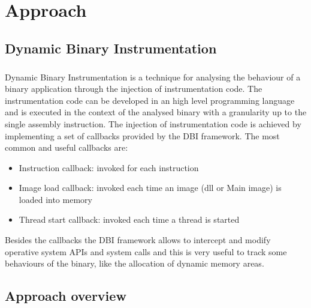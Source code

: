\chapter{Approach}
\label{chapter3}
\thispagestyle{empty}

\section{Dynamic Binary Instrumentation}
\paragraph{}
Dynamic Binary Instrumentation is a technique for analysing the behaviour of a binary application through the injection of instrumentation code. The instrumentation code can be developed in an high level programming language and is executed in the context of the analysed binary with a granularity up to the single assembly instruction. The injection of instrumentation code is achieved by implementing a set of callbacks provided by the DBI framework. The most common and useful callbacks are:
\begin{itemize}
 \item Instruction callback: invoked for each instruction
 \item Image load callback: invoked each time an image (dll or Main image) is loaded into memory
 \item Thread start callback: invoked each time a thread is started
\end{itemize}
Besides the callbacks the DBI framework allows to intercept and modify operative system APIs and system calls and this is very useful to track some behaviours of the binary, like the allocation of dynamic memory areas.


\section{Approach overview}
